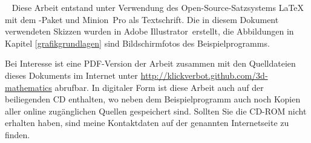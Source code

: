 \thispagestyle{plain}
\clearpage
~\vfill
\scriptsize
Diese Arbeit entstand unter Verwendung des Open-Source-Satzsystems \LaTeX{} mit dem \KOMAScript-Paket und Minion~Pro als Textschrift.
Die in diesem Dokument verwendeten Skizzen wurden in Adobe Illustrator\textregistered\ erstellt, die Abbildungen in Kapitel \ref{grafikgrundlagen} sind Bildschirmfotos des Beispielprogramms.

Bei Interesse ist eine PDF-Version der Arbeit zusammen mit den Quelldateien dieses Dokuments im Internet unter \url{http://klickverbot.github.com/3d-mathematics} abrufbar. In digitaler Form ist diese Arbeit auch auf der beiliegenden CD enthalten, wo neben dem Beispielprogramm auch noch Kopien aller online zugänglichen Quellen gespeichert sind. Sollten Sie die CD-ROM nicht erhalten haben, sind meine Kontaktdaten auf der genannten Internetseite zu finden.